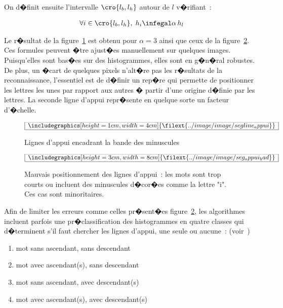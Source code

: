 On d�finit ensuite l'intervalle $\cro{l_b,l_h}$ autour de $l$ v�rifiant~:

            \begin{eqnarray}
            \forall i \in \cro{l_b,l_h}, \; h_i \infegal \alpha \, h_l
            \end{eqnarray}

Le r�sultat de la figure~\ref{image_ligne_appui_fig} est obtenu pour $\alpha = 3$ ainsi que ceux de la figure~\ref{image_ligne_appui_fig_bad}. Ces formules peuvent �tre ajust�es manuellement sur quelques images. Puisqu'elles sont bas�es sur des histogrammes, elles sont en g�n�ral robustes. De plus, un �cart de quelques pixels n'alt�re pas les r�sultats de la reconnaissance, l'essentiel est de d�finir un rep�re qui permette de positionner les lettres les unes par rapport aux autres � partir d'une origine d�finie par les lettres. La seconde ligne d'appui repr�sente en quelque sorte un facteur d'�chelle.

            \begin{figure}[ht]
        $$\frame{$\begin{array}[c]{c}\includegraphics[height=1cm, width=4cm]
        {\filext{../image/image/segline_appui}}\end{array}$}$$
        \caption{    Lignes d'appui encadrant la bande des minuscules}
        \label{image_ligne_appui_fig}
            \end{figure}

            \begin{figure}[ht]
        $$\frame{$\begin{array}[c]{c}\includegraphics[height=3cm, width=8cm]
        {\filext{../image/image/seg_appui_bad}}\end{array}$}$$
        \caption{    Mauvais positionnement des lignes d'appui~: les mots sont trop courts ou incluent 
                            des minuscules d�cor�es comme la lettre "i". Ces cas sont minoritaires.}
        \label{image_ligne_appui_fig_bad}
            \end{figure}

Afin de limiter les erreurs comme celles pr�sent�es figure~\ref{image_ligne_appui_fig_bad}, les algorithmes incluent parfois une pr�classification des histogrammes en quatre classes qui d�terminent s'il faut chercher les lignes d'appui, une seule ou aucune~: (voir~)

            \begin{enumerate}
            \item mot sans ascendant, sans descendant
            \item mot avec ascendant(s), sans descendant
            \item mot sans ascendant, avec descendant(s)
            \item mot avec ascendant(s), avec descendant(s)
            \end{enumerate}

